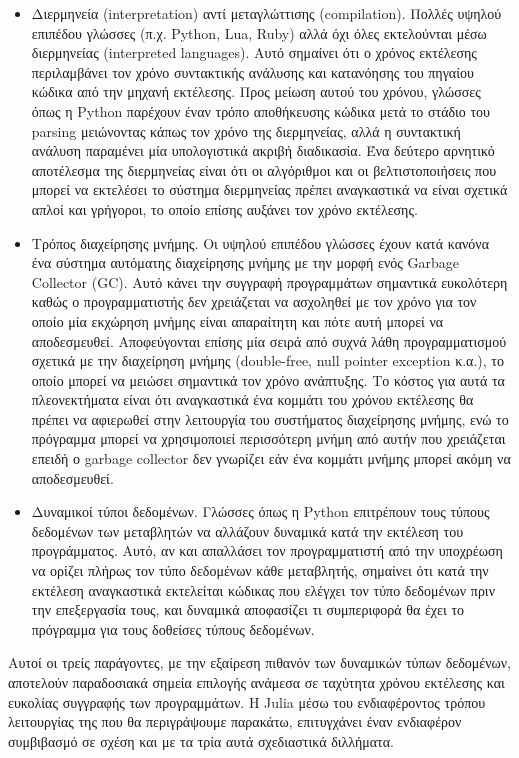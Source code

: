 \begin{itemize}
    \item Διερμηνεία (interpretation) αντί μεταγλώττισης (compilation).
        Πολλές υψηλού επιπέδου γλώσσες (π.χ. Python, Lua, Ruby) αλλά όχι όλες εκτελούνται μέσω διερμηνείας (interpreted languages).
        Αυτό σημαίνει ότι ο χρόνος εκτέλεσης περιλαμβάνει τον χρόνο συντακτικής ανάλυσης και κατανόησης του πηγαίου κώδικα από την μηχανή εκτέλεσης.
        Προς μείωση αυτού του χρόνου, γλώσσες όπως η Python παρέχουν έναν τρόπο αποθήκευσης κώδικα μετά το στάδιο του parsing μειώνοντας κάπως τον χρόνο της διερμηνείας, αλλά η συντακτική ανάλυση παραμένει μία υπολογιστικά ακριβή διαδικασία.
        Ένα δεύτερο αρνητικό αποτέλεσμα της διερμηνείας είναι ότι οι αλγόριθμοι και οι βελτιστοποιήσεις που μπορεί να εκτελέσει το σύστημα διερμηνείας πρέπει αναγκαστικά να είναι σχετικά απλοί και γρήγοροι, το οποίο επίσης αυξάνει τον χρόνο εκτέλεσης.
    \item Τρόπος διαχείρησης μνήμης. Οι υψηλού επιπέδου γλώσσες έχουν κατά κανόνα ένα σύστημα αυτόματης διαχείρησης μνήμης με την μορφή ενός Garbage Collector (GC).
        Αυτό κάνει την συγγραφή προγραμμάτων σημαντικά ευκολότερη καθώς ο προγραμματιστής δεν χρειάζεται να ασχοληθεί με τον χρόνο για τον οποίο μία εκχώρηση μνήμης είναι απαραίτητη και πότε αυτή μπορεί να αποδεσμευθεί.
        Αποφεύγονται επίσης μία σειρά από συχνά λάθη προγραμματισμού σχετικά με την διαχείρηση μνήμης (double-free, null pointer exception κ.α.), το οποίο μπορεί να μειώσει σημαντικά τον χρόνο ανάπτυξης.
        Το κόστος για αυτά τα πλεονεκτήματα είναι ότι αναγκαστικά ένα κομμάτι του χρόνου εκτέλεσης θα πρέπει να αφιερωθεί στην λειτουργία του συστήματος διαχείρησης μνήμης, ενώ το πρόγραμμα μπορεί να χρησιμοποιεί περισσότερη μνήμη από αυτήν που χρειάζεται επειδή ο garbage collector δεν γνωρίζει εάν ένα κομμάτι μνήμης μπορεί ακόμη να αποδεσμευθεί.
    \item Δυναμικοί τύποι δεδομένων.
        Γλώσσες όπως η Python επιτρέπουν τους τύπους δεδομένων των μεταβλητών να αλλάζουν δυναμικά κατά την εκτέλεση του προγράμματος.
        Αυτό, αν και απαλλάσει τον προγραμματιστή από την υποχρέωση να ορίζει πλήρως τον τύπο δεδομένων κάθε μεταβλητής, σημαίνει ότι κατά την εκτέλεση αναγκαστικά εκτελείται κώδικας που ελέγχει τον τύπο δεδομένων πριν την επεξεργασία τους, και δυναμικά αποφασίζει τι συμπεριφορά θα έχει το πρόγραμμα για τους δοθείσες τύπους δεδομένων.
\end{itemize}

Αυτοί οι τρείς παράγοντες, με την εξαίρεση πιθανόν των δυναμικών τύπων δεδομένων, αποτελούν παραδοσιακά σημεία επιλογής ανάμεσα σε ταχύτητα χρόνου εκτέλεσης και ευκολίας συγγραφής των προγραμμάτων.
Η Julia μέσω του ενδιαφέροντος τρόπου λειτουργίας της που θα περιγράψουμε παρακάτω, επιτυγχάνει έναν ενδιαφέρον συμβιβασμό σε σχέση και με τα τρία αυτά σχεδιαστικά διλλήματα.

